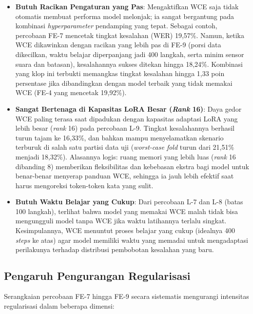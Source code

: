 \begin{itemize}
    \item \textbf{Butuh Racikan Pengaturan yang Pas}: Mengaktifkan WCE saja tidak otomatis membuat performa model melonjak; ia sangat bergantung pada kombinasi \textit{hyperparameter} pendamping yang tepat. Sebagai contoh, percobaan FE-7 mencetak tingkat kesalahan (WER) 19,57\%. Namun, ketika WCE dikawinkan dengan racikan yang lebih pas di FE-9 (porsi data dikecilkan, waktu belajar diperpanjang jadi 400 langkah, serta minim sensor suara dan batasan), kesalahannya sukses ditekan hingga 18,24\%. Kombinasi yang klop ini terbukti memangkas tingkat kesalahan hingga 1,33 poin persentase jika dibandingkan dengan model terbaik yang tidak memakai WCE (FE-4 yang mencetak 19,92\%).

    \item \textbf{Sangat Bertenaga di Kapasitas LoRA Besar (\textit{Rank} 16)}: Daya gedor WCE paling terasa saat dipadukan dengan kapasitas adaptasi LoRA yang lebih besar (\textit{rank} 16) pada percobaan L-9. Tingkat kesalahannya berhasil turun tajam ke 16,33\%, dan bahkan mampu menyelamatkan skenario terburuk di salah satu partisi data uji (\textit{worst-case fold} turun dari 21,51\% menjadi 18,32\%). Alasannya logis: ruang memori yang lebih luas (\textit{rank} 16 dibanding 8) \cite{hu2022lora} memberikan fleksibilitas dan kebebasan ekstra bagi model untuk benar-benar menyerap panduan WCE, sehingga ia jauh lebih efektif saat harus mengoreksi token-token kata yang sulit.

    \item \textbf{Butuh Waktu Belajar yang Cukup}: Dari percobaan L-7 dan L-8 (batas 100 langkah), terlihat bahwa model yang memakai WCE malah tidak bisa mengungguli model tanpa WCE jika waktu latihannya terlalu singkat. Kesimpulannya, WCE menuntut proses belajar yang cukup (idealnya 400 \textit{steps} ke atas) agar model memiliki waktu yang memadai untuk mengadaptasi perilakunya terhadap distribusi pembobotan kesalahan yang baru.
\end{itemize}

\subsection{Pengaruh Pengurangan Regularisasi}

Serangkaian percobaan FE-7 hingga FE-9 secara sistematis mengurangi intensitas regularisasi dalam beberapa dimensi:

